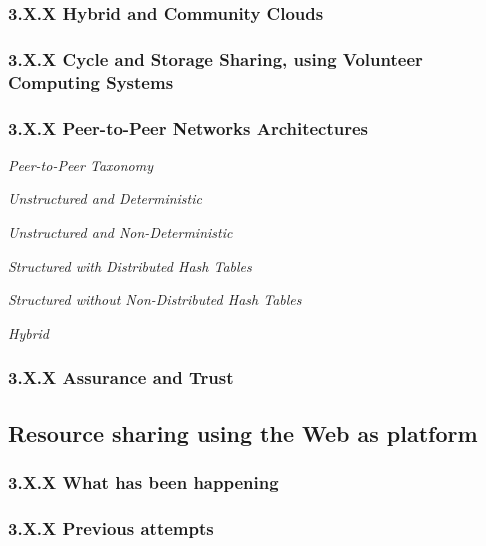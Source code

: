 \documentclass{./llncs2e/llncs}
\begin{document}
\subsubsection{3.X.X Hybrid and Community Clouds}



\subsubsection{3.X.X Cycle and Storage Sharing, using Volunteer Computing Systems}


\subsubsection{3.X.X Peer-to-Peer Networks Architectures}

\textit{Peer-to-Peer Taxonomy}

\textit{Unstructured and Deterministic}


\textit{Unstructured and Non-Deterministic}


\textit{Structured with Distributed Hash Tables}


\textit{Structured without Non-Distributed Hash Tables}

\textit{Hybrid}



\subsubsection{3.X.X Assurance and Trust}




% 
% 
\subsection{Resource sharing using the Web as platform} 


\subsubsection{3.X.X What has been happening}

\subsubsection{3.X.X Previous attempts}
\end{document}
